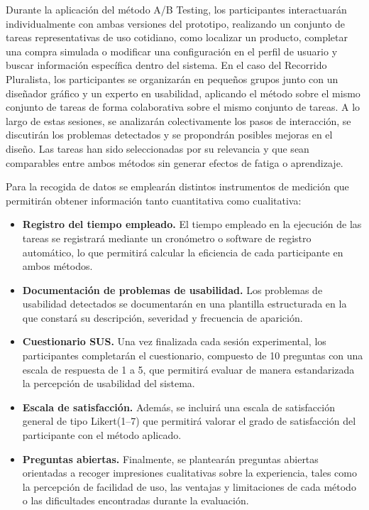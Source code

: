 \documentclass[a4paper,12pt]{report}
\begin{document}
Durante la aplicación del método A/B Testing, los participantes interactuarán individualmente con ambas versiones del prototipo, 
realizando un conjunto de tareas representativas de uso cotidiano, como localizar un producto, completar una compra simulada o modificar una 
configuración en el perfil de usuario y buscar información específica dentro del sistema. En el caso del Recorrido Pluralista, los 
participantes se organizarán en pequeños grupos junto con un diseñador gráfico y un experto en usabilidad, aplicando el método 
sobre el mismo conjunto de tareas de forma colaborativa sobre el mismo conjunto de tareas. A lo largo de estas sesiones, se analizarán colectivamente 
los pasos de interacción, se discutirán los problemas detectados y se propondrán posibles mejoras en el diseño. Las tareas han sido seleccionadas por su 
relevancia y que sean comparables entre ambos métodos sin generar efectos de fatiga o aprendizaje. 


Para la recogida de datos se emplearán distintos instrumentos de medición que permitirán obtener información tanto cuantitativa como cualitativa: 

\begin{itemize}
    \item \textbf{Registro del tiempo empleado.} El tiempo empleado en la ejecución de las tareas se registrará mediante un cronómetro o software de registro automático, lo que permitirá calcular la eficiencia de cada participante en ambos métodos. 
    \item \textbf{Documentación de problemas de usabilidad.} Los problemas de usabilidad detectados se documentarán en una plantilla estructurada en la que constará su descripción, severidad y frecuencia de aparición.
    \item \textbf{Cuestionario SUS.} Una vez finalizada cada sesión experimental, los participantes completarán el cuestionario, compuesto de 10 preguntas con una escala de respuesta de 1 a 5, que permitirá evaluar de manera estandarizada la percepción de usabilidad del sistema.
    \item \textbf{Escala de satisfacción.} Además, se incluirá una escala de satisfacción general de tipo Likert(1--7) que permitirá valorar el grado de satisfacción del participante con el método aplicado.
    \item \textbf{Preguntas abiertas.} Finalmente, se plantearán preguntas abiertas orientadas a recoger impresiones cualitativas sobre la experiencia, tales como la percepción de facilidad de uso, las ventajas y limitaciones de cada método o las dificultades encontradas durante la evaluación.  
\end{itemize}
\end{document}
